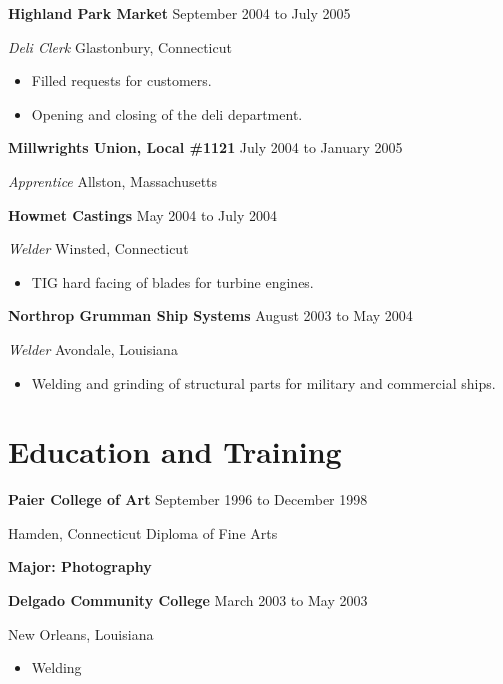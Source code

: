 \documentclass[9pt]{extarticle}
\begin{document}
\textbf{Highland Park Market} \hfill September 2004 to July 2005

\textit{Deli Clerk} \hfill Glastonbury, Connecticut

\begin{multicols}{2}
\begin{itemize}
    \item Filled requests for customers.
    \item Opening and closing of the deli department.
\end{itemize}
\end{multicols}

\textbf{Millwrights Union, Local \#1121} \hfill July 2004 to January 2005 

\textit{Apprentice} \hfill Allston, Massachusetts

\hfill

\textbf{Howmet Castings} \hfill May 2004 to July 2004 

\textit{Welder} \hfill Winsted, Connecticut

\begin{itemize}
    \item TIG hard facing of blades for turbine engines.
\end{itemize}

\textbf{Northrop Grumman Ship Systems} \hfill August 2003 to May 2004 

\textit{Welder} \hfill Avondale, Louisiana

\begin{itemize}
    \item Welding and grinding of structural parts for military and commercial ships.
\end{itemize}

\section*{Education and Training}
\textbf{Paier College of Art}  \hfill September 1996 to December 1998

Hamden, Connecticut \hfill Diploma of Fine Arts 

\hfill \textbf{Major: Photography}

\hfill

\textbf{Delgado Community College} \hfill March 2003 to May 2003

New Orleans, Louisiana

\begin{itemize}
    \item Welding
\end{itemize}
\end{document}
